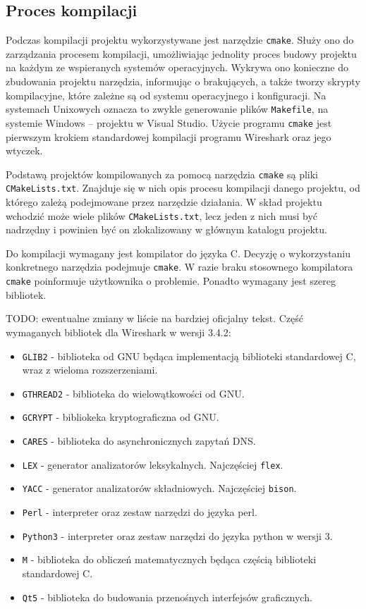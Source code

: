 \documentclass[a4paper, 12pt, twoside, openright]{article}
\begin{document}
	\subsection{Proces kompilacji}
	\indent\par
	Podczas kompilacji projektu wykorzystywane jest narzędzie \texttt{cmake}. Służy ono do zarządzania procesem kompilacji,
	umożliwiając jednolity proces budowy projektu
	na każdym ze wspieranych systemów operacyjnych. Wykrywa ono konieczne do zbudowania projektu narzędzia, informując
	o brakujących, a także tworzy skrypty kompilacyjne, które zależne są od systemu operacyjnego i konfiguracji. Na systemach Unixowych
	oznacza to zwykle generowanie plików \texttt{Makefile}, na systemie Windows -- projektu w Visual Studio. Użycie programu \texttt{cmake}
	jest pierwszym krokiem standardowej kompilacji programu Wireshark oraz jego wtyczek.

	Podstawą projektów kompilowanych za pomocą narzędzia \texttt{cmake} są pliki \texttt{CMakeLists.txt}.
	Znajduje się w nich opis procesu kompilacji danego projektu, od którego zależą podejmowane przez narzędzie działania.
	W skład projektu wchodzić może wiele plików \texttt{CMakeLists.txt}, lecz jeden z nich musi być nadrzędny i powinien być
	on zlokalizowany w głównym katalogu projektu.

	Do kompilacji wymagany jest kompilator do języka C. Decyzję o wykorzystaniu konkretnego narzędzia podejmuje \texttt{cmake}.
	W razie braku stosownego kompilatora \texttt{cmake} poinformuje użytkownika o problemie. Ponadto wymagany jest szereg
	bibliotek.

	TODO: ewentualne zmiany w liście na bardziej oficjalny tekst.
	Część wymaganych bibliotek dla Wireshark w wersji 3.4.2:
	\begin{itemize}
		\item \texttt{GLIB2} - biblioteka od GNU będąca implementacją biblioteki standardowej C, wraz z wieloma rozszerzeniami.
		\item \texttt{GTHREAD2} - biblioteka do wielowątkowości od GNU.
		\item \texttt{GCRYPT} - bibliokeka kryptograficzna od GNU.
		\item \texttt{CARES} - biblioteka do asynchronicznych zapytań DNS.
		\item \texttt{LEX} - generator analizatorów leksykalnych. Najczęściej \texttt{flex}.
		\item \texttt{YACC} - generator analizatorów składniowych. Najczęściej \texttt{bison}.
		\item \texttt{Perl} - interpreter oraz zestaw narzędzi do języka perl.
		\item \texttt{Python3} - interpreter oraz zestaw narzędzi do języka python w wersji 3.
		\item \texttt{M} - biblioteka do obliczeń matematycznych będąca częścią biblioteki standardowej C.
		\item \texttt{Qt5} - biblioteka do budowania przenośnych interfejsów graficznych.
	\end{itemize}
\end{document}
